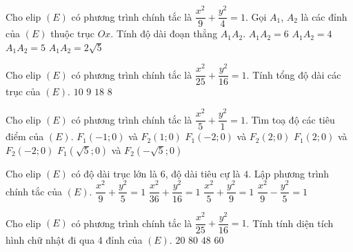 \begin{ex}%
	Cho elip $\left(E\right)$ có phương trình chính tắc là $\dfrac{x^2}{9}+\dfrac{y^2}{4}=1$. Gọi $A_1$, $A_2$ là các đỉnh của $(E)$ thuộc trục $Ox$. Tính độ dài đoạn thẳng $A_1A_2$.
	\choice
	{\True $A_1A_2=6$}
	{$A_1A_2=4$}
	{$A_1A_2=5$}
	{$A_1A_2=2\sqrt{5}$}
\end{ex}
\begin{ex}%
	Cho elip $\left(E\right)$ có phương trình chính tắc là $\dfrac{x^2}{25}+\dfrac{y^2}{16}=1$. Tính tổng độ dài các trục của $(E)$.
	\choice
	{\True $10$}
	{$9$}
	{\True $18$}
	{$8$}
\end{ex}



\begin{ex}%
	Cho elip $(E)$ có phương trình chính tắc là $\dfrac{x^2}{5}+\dfrac{y^2}{1}=1$. Tìm toạ độ các tiêu điểm của $(E)$. 
	\choice
	{ $F_1(-1;0)$ và $F_2(1;0)$}
	{\True $F_1(-2;0)$ và $F_2(2;0)$}
	{$F_1(2;0)$ và $F_2(-2;0)$}
	{$F_1(\sqrt{5};0)$ và $F_2(-\sqrt{5};0)$}
\end{ex}

\begin{ex}%
	Cho elip $(E)$ có  độ dài trục lớn là $6$, độ dài tiêu cự  là $4$. Lập phương trình chính tắc của $(E)$.
	\choice
	{ \True $\dfrac{x^2}{9}+\dfrac{y^2}{5}=1$}
	{$\dfrac{x^2}{36}+\dfrac{y^2}{16}=1$}
	{ $\dfrac{x^2}{5}+\dfrac{y^2}{9}=1$}
	{$\dfrac{x^2}{9}-\dfrac{y^2}{5}=1$}
\end{ex}


\begin{ex}%
	Cho elip $(E)$ có phương trình chính tắc là $\dfrac{x^2}{25}+\dfrac{y^2}{16}=1$. Tính tính diện tích hình chữ nhật đi qua 4 đỉnh của $(E)$.
	\choice
	{ $20$}
	{\True $80$}
	{$48$}
	{$60$}
\end{ex}

